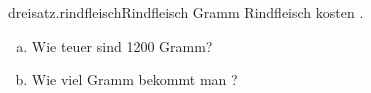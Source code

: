 \begin{exercise}{dreisatz.rindfleisch}{Rindfleisch}
  \ifproblem{} Gramm Rindfleisch kosten .
    \begin{enumerate}[a)]
      \item Wie teuer sind 1200 Gramm?
      \item Wie viel Gramm bekommt man ?
    \end{enumerate}
  \fi
\end{exercise}
